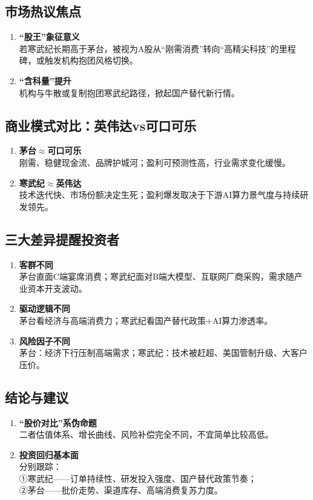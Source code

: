 \subsection{市场热议焦点}
\begin{enumerate}[leftmargin=*, nosep]
    \item \textbf{“股王”象征意义 } \\
    {\color{red}若寒武纪长期高于茅台，被视为A股从“刚需消费”转向“高精尖科技”的里程碑，或触发机构抱团风格切换。}
    \item \textbf{“含科量”提升 } \\
    机构与牛散或复制抱团寒武纪路径，掀起国产替代新行情。
\end{enumerate}

\subsection{商业模式对比：英伟达vs可口可乐}
\begin{enumerate}[leftmargin=*, nosep]
    \item \textbf{茅台$\approx$可口可乐}  \\
    刚需、稳健现金流、品牌护城河；盈利可预测性高，行业需求变化缓慢。
    \item \textbf{寒武纪$\approx$英伟达}  \\
    技术迭代快、市场份额决定生死；盈利爆发取决于下游AI算力景气度与持续研发领先。
\end{enumerate}

\subsection{三大差异提醒投资者}
\begin{enumerate}[leftmargin=*, nosep]
    \item \textbf{客群不同}  \\
    茅台直面C端宴席消费；寒武纪面对B端大模型、互联网厂商采购，需求随产业资本开支波动。
    \item \textbf{驱动逻辑不同}  \\
    茅台看经济与高端消费力；寒武纪看国产替代政策+AI算力渗透率。
    \item \textbf{风险因子不同}  \\
    茅台：经济下行压制高端需求；寒武纪：技术被赶超、美国管制升级、大客户压价。
\end{enumerate}

\subsection{结论与建议}
\begin{enumerate}[leftmargin=*, nosep]
    \item \textbf{“股价对比”系伪命题 } \\
    二者估值体系、增长曲线、风险补偿完全不同，不宜简单比较高低。
    \item \textbf{投资回归基本面}  \\
    分别跟踪：  \\
    ①寒武纪——订单持续性、研发投入强度、国产替代政策节奏； \\ 
    ②茅台——批价走势、渠道库存、高端消费复苏力度。
\end{enumerate}

